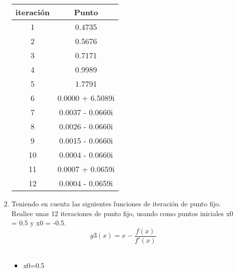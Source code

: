 \documentclass{udpreport}
\begin{document}
\begin{enumerate}
\begin{enumerate}
\begin{table}[H]
\begin{tabular} { |c|c|}
        \hline
        iteración  &  Punto\\
        \hline
        1 &  0.4735       \\
         \hline
        2 &   0.5676     \\
         \hline
        3 &  0.7171
       \\
         \hline
        4 &   0.9989     \\
         \hline
        5 & 1.7791        \\
         \hline
        6 &  0.0000 + 6.5089i      \\
         \hline
        7 &   0.0037 - 0.0660i       \\
         \hline
        8 &     0.0026 - 0.0660i   \\
         \hline
        9 &   0.0015 - 0.0660i       \\
         \hline
        10 &    0.0004 - 0.0660i      \\
         \hline
        11 &    0.0007 + 0.0659i \\
         \hline
        12 &   0.0004 - 0.0659i       \\
        \hline
        
        \end{tabular}
        
    \end{table}
 \vspace{3cm}   
 \item Teniendo en cuenta las siguientes funciones de iteración de punto fijo.  Realice unas 12 iteraciones de punto fijo, usando como puntos iniciales x0 = 0.5 y x0 = -0.5.\\   
 
 \begin{equation}
 g3(x) = x-\frac{f(x)}
{f'(x)}
\end{equation}
\\
 \begin{itemize}
\item x0=0.5
\end{itemize}

\begin{table}[H]
    \centering
        \begin{tabular} { |c|c|}
        

\end{tabular}
\end{table}
\end{enumerate}
\end{enumerate}
\end{document}
